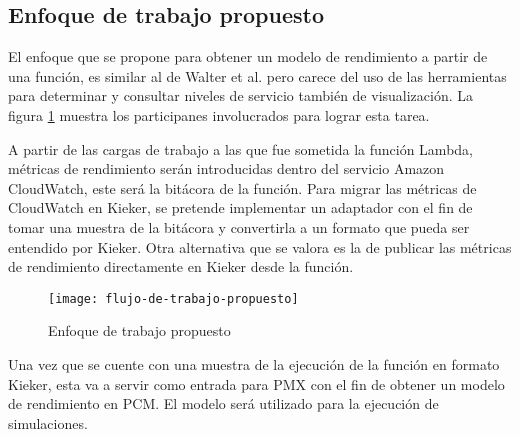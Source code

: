 \subsection{Enfoque de trabajo propuesto}
El enfoque que se propone para obtener un modelo de rendimiento a partir de una función, es similar al de Walter et al. pero carece del uso de las herramientas para determinar y consultar niveles de servicio también de visualización. La figura \ref{fig:flujo-de-trabajo-propuesto} muestra los participanes involucrados para lograr esta tarea. 

A partir de las cargas de trabajo a las que fue sometida la función Lambda, métricas de rendimiento serán introducidas dentro del servicio Amazon CloudWatch, este será la bitácora de la función. Para migrar las métricas de CloudWatch en Kieker, se pretende implementar un adaptador con el fin de tomar una muestra de la bitácora y convertirla a un formato que pueda ser entendido por Kieker. Otra alternativa que se valora es la de publicar las métricas de rendimiento directamente en Kieker  desde la función. 

\begin{figure}[h]
  \centering
  \texttt{[image: flujo-de-trabajo-propuesto]}
  \caption{Enfoque de trabajo propuesto}
  \label{fig:flujo-de-trabajo-propuesto}
\end{figure}

Una vez que se cuente con una muestra de la ejecución de la función en formato Kieker, esta va a servir como entrada para PMX con el fin de obtener un modelo de rendimiento en PCM. El modelo será utilizado para la ejecución de simulaciones.

